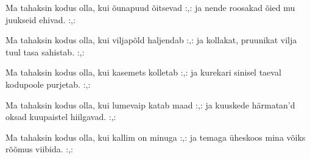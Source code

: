 Ma tahaksin kodus olla,
kui \~ounapuud \~oitsevad
:,: ja nende roosakad \~oied
    mu juukseid ehivad. :,: 

Ma tahaksin kodus olla,
kui viljap\~old haljendab
:,: ja kollakat, pruunikat vilja
    tuul tasa sahistab. :,: 

Ma tahaksin kodus olla,
kui kasemets kolletab
:,: ja kurekari sinisel taeval
    kodupoole purjetab. :,: 

Ma tahaksin kodus olla,
kui lumevaip katab maad
:,: ja kuuskede h\"armatan'd oksad
    kuupaistel hiilgavad. :,: 

Ma tahaksin kodus olla,
kui kallim on minuga
:,: ja temaga \"uheskoos mina
    v\~oiks r\~o\~omus viibida. :,: 
